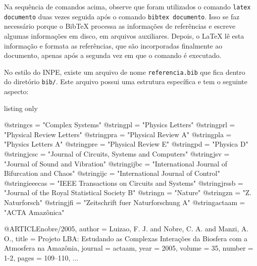 Na sequência de comandos acima, observe que foram utilizados o comando {\tt latex documento} duas vezes seguida após o comando {\tt bibtex documento}. Isso se faz necessário porque o Bib\TeX{} processa as informações de referências e escreve algumas informações em disco, em arquivos auxiliares. Depois, o \LaTeX{} lê esta informação e formata as referências, que são incorporadas finalmente ao documento, apenas após a segunda vez em que o comando é executado.

No estilo do INPE, existe um arquivo de nome {\tt referencia.bib} que fica dentro do diretório {\tt bib/}. Este arquivo possui uma estrutura específica e tem o seguinte aspecto:

\begin{texexp}{listing only}

@string{cs =      "Complex Systems"}
@string{pl =      "Physics Letters"}
@string{prl =     "Physical Review Letters"}
@string{pra =     "Physical Review A"} 
@string{pla =     "Physics Letters A"} 
@string{pre =     "Physical Review E"} 
@string{pd =      "Physica D"} 
@string{jcsc =    "Journal of Circuits, Systems and Computers"}
@string{jsv =     "Journal of Sound and Vibration"}
@string{ijbc =    "International Journal of Bifurcation and Chaos"}
@string{ijc =     "International Journal of Control"}
@string{ieeecas = "IEEE Transactions on Circuits and Systems"}
@string{jrssb =   "Journal of the Royal Statistical Society B"} 
@string{n =       "Nature"}
@string{zn =      "Z. Naturforsch"}
@string{jfi =     "Zeitschrift fuer Naturforschung A"} 
@string{actaam =  "ACTA Amaz\^onica"}

@ARTICLE{nobre/2005,
  author    = {Luizao, F. J. and Nobre, C. A. and Manzi, A. O.},
  title     = {Projeto LBA: Estudando as Complexas Intera{\c c}\~oes da Biosfera com a Atmosfera na Amaz\^onia},
  journal   = actaam,
  year      = {2005},
  volume    = {35},
  number    = {1-2},
  pages     = {109--110},
}
...
\end{texexp}

